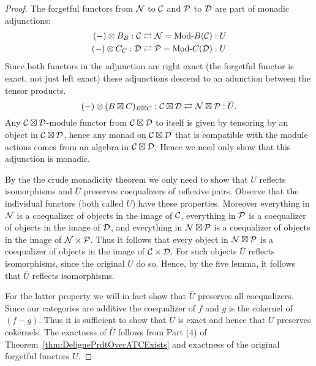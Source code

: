 \documentclass{amsart}
\begin{document}
\begin{proof}
	The forgetful functors from $\mathcal N$ to $\mathcal C$ and $\mathcal P$ to $\mathcal D$ are part of monadic adjunctions:
	\begin{align*}
		(-) \otimes B_{B}:\cC \rightleftarrows \cN = \Mod{}{B}(\cC): U \\
		(-) \otimes C_{C}:\cD \rightleftarrows \cP = \Mod{}{C}(\cD): U
	\end{align*}
	Since both functors in the adjunction are right exact (the forgetful functor is exact, not just left exact) these adjunctions descend to an adunction between the tensor products. 
	\begin{equation*}
		(-) \otimes (B \boxtimes C)_{B \boxtimes C}: \mathcal C \boxtimes \mathcal D \rightleftarrows \mathcal N \boxtimes \mathcal P: \overline{U}.
	\end{equation*}
	Any $\mathcal C \boxtimes \mathcal D$-module functor from $\mathcal C \boxtimes \mathcal D$ to itself is given by tensoring by an object in $\mathcal C \boxtimes \mathcal D$, hence any monad on $\mathcal C \boxtimes \mathcal D$ that is compatible with the module actions comes from an algebra in $\mathcal C \boxtimes \mathcal D$.  Hence we need only show that this adjunction is monadic.  
		
	By the the crude monadicity theorem \cite[\S~3.5]{MR771116} we only need to show that $\overline{U}$ reflects isomorphisms and $\overline{U}$ preserves coequalizers of reflexive pairs.  Observe that the individual functors (both called $U$) have these properties. Moreover everything in $\mathcal N$ is a coequalizer of objects in the image of $\mathcal C$, everything in $\mathcal P$ is a coequalizer of objects in the image of $\mathcal D$, and everything in $\mathcal N \boxtimes \mathcal P$ is a coequalizer of objects in the image of $\mathcal N \times \mathcal P$. Thus it follows that every object in $\mathcal N \boxtimes \mathcal P$ is a coequalizer of objects in the image of $\mathcal C \times \mathcal D$. For such objects $\overline{U}$ reflects isomorphisms, since the original $U$ do so. Hence, by the five lemma, it follows that $\overline{U}$ reflects isomorphisms. 

For the latter property we will in fact show that $\overline{U}$ preserves all coequalizers. Since our categories are additive the coequalizer of $f$ and $g$ is the cokernel of $(f-g)$.  Thus it is sufficient to show that $\overline{U}$ is exact and hence that $\overline{U}$ preserves cokernels.  The exactness of $\overline{U}$ follows from Part (4) of Theorem~\ref{thm:DelignePrdtOverATCExists} and exactness of the original forgetful functors $U$.  
\end{proof}





\end{document}
